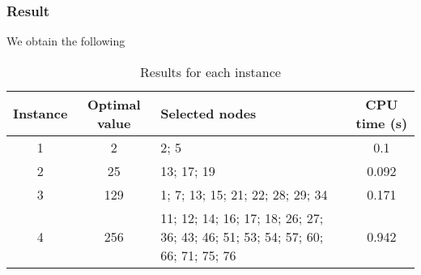 \newpage

\subsubsection*{Result}
We obtain the following

\begin{table}[h]
	\centering
	\begin{tabularx}{\textwidth}{|c|c|X|c|}
		\hline
		\textbf{Instance} & \textbf{Optimal value} & \textbf{Selected nodes} & \textbf{CPU time (s)} \\
		\hline
		1 & 2 & 2; 5 & 0.1 \\
		\hline
		2 & 25 & 13; 17; 19 & 0.092 \\
		\hline
		3 & 129 & 1; 7; 13; 15; 21; 22; 28; 29; 34 & 0.171 \\
		\hline
		4 & 256 & 11; 12; 14; 16; 17; 18; 26; 27; 36; 43; 46; 51; 53; 54; 57; 60; 66; 71; 75; 76 & 0.942 \\
		\hline
	\end{tabularx}
	\caption{Results for each instance}
	\label{tab:instance_costs}
\end{table}
